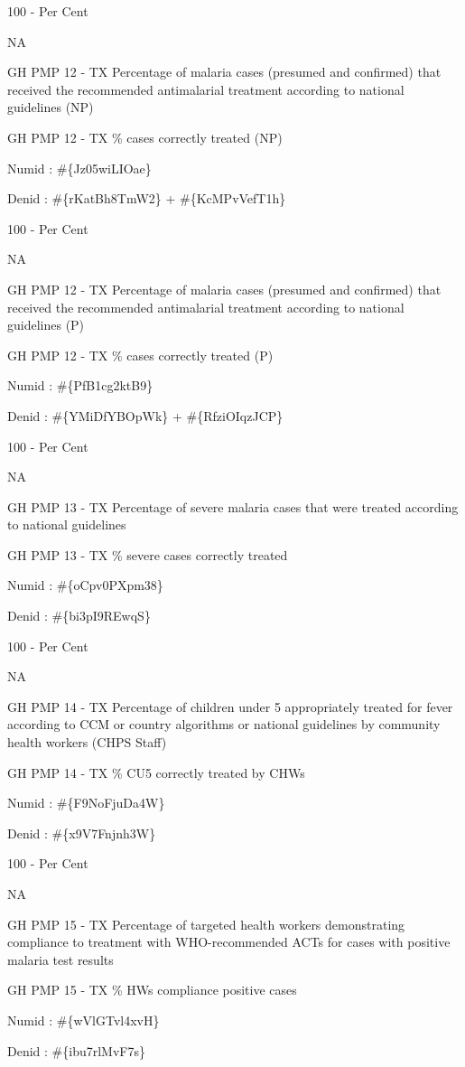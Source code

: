 \documentclass[]{book}
\begin{document}
100 - Per Cent

NA

GH PMP 12 - TX Percentage of malaria cases (presumed and confirmed) that received the recommended antimalarial treatment according to national guidelines (NP)

GH PMP 12 - TX \% cases correctly treated (NP)

Numid : \#\{Jz05wiLIOae\}

Denid : \#\{rKatBh8TmW2\} + \#\{KcMPvVefT1h\}

100 - Per Cent

NA

GH PMP 12 - TX Percentage of malaria cases (presumed and confirmed) that received the recommended antimalarial treatment according to national guidelines (P)

GH PMP 12 - TX \% cases correctly treated (P)

Numid : \#\{PfB1cg2ktB9\}

Denid : \#\{YMiDfYBOpWk\} + \#\{RfziOIqzJCP\}

100 - Per Cent

NA

GH PMP 13 - TX Percentage of severe malaria cases that were treated according to national guidelines

GH PMP 13 - TX \% severe cases correctly treated

Numid : \#\{oCpv0PXpm38\}

Denid : \#\{bi3pI9REwqS\}

100 - Per Cent

NA

GH PMP 14 - TX Percentage of children under 5 appropriately treated for fever according to CCM or country algorithms or national guidelines by community health workers (CHPS Staff)

GH PMP 14 - TX \% CU5 correctly treated by CHWs

Numid : \#\{F9NoFjuDa4W\}

Denid : \#\{x9V7Fnjnh3W\}

100 - Per Cent

NA

GH PMP 15 - TX Percentage of targeted health workers demonstrating compliance to treatment with WHO-recommended ACTs for cases with positive malaria test results

GH PMP 15 - TX \% HWs compliance positive cases

Numid : \#\{wVlGTvl4xvH\}

Denid : \#\{ibu7rlMvF7s\}
\end{document}
